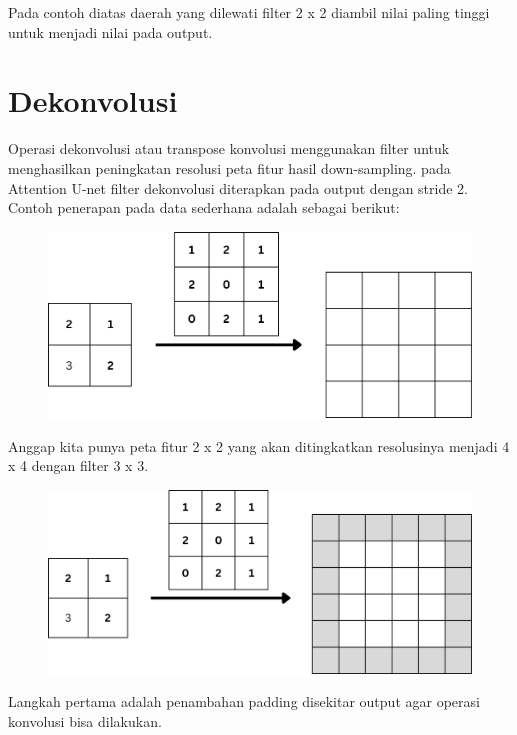 \noindent Pada contoh diatas daerah yang dilewati filter 2 x 2 diambil nilai paling tinggi untuk menjadi nilai pada output.

\section{Dekonvolusi}

\noindent Operasi dekonvolusi atau transpose konvolusi menggunakan filter untuk menghasilkan peningkatan resolusi peta fitur hasil down-sampling. pada Attention U-net filter dekonvolusi  diterapkan pada output dengan stride 2. Contoh penerapan pada data sederhana adalah sebagai berikut:

\begin{figure}[H]
	\centering
	\includegraphics[scale=.4]{gambar/lampiran/dekonv-1.png}
\end{figure}

\noindent Anggap kita punya peta fitur 2 x 2 yang akan ditingkatkan resolusinya menjadi 4 x 4 dengan filter 3 x 3.

\begin{figure}[H]
	\centering
	\includegraphics[scale=.4]{gambar/lampiran/dekonv-2.png}
\end{figure}

\noindent Langkah pertama adalah penambahan padding disekitar output agar operasi konvolusi bisa dilakukan.

